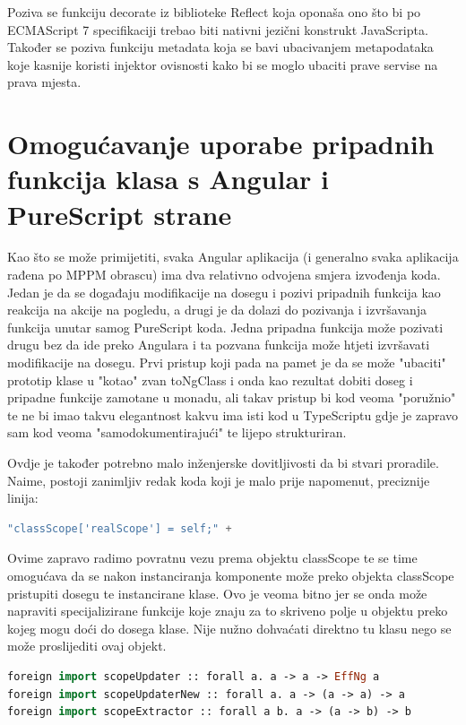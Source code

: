 \documentclass[times, utf8, zavrsni]{fer}
\begin{document}
Poziva se funkciju decorate iz biblioteke Reflect koja oponaša ono što bi po ECMAScript 7 specifikaciji trebao biti nativni jezični konstrukt JavaScripta. Također se poziva funkciju metadata koja se bavi ubacivanjem metapodataka koje kasnije koristi injektor ovisnosti kako bi se moglo ubaciti prave servise na prava mjesta.

\section{Omogućavanje uporabe pripadnih funkcija klasa s Angular i PureScript strane}
Kao što se može primijetiti, svaka Angular aplikacija (i generalno svaka aplikacija rađena po MPPM obrascu) ima dva relativno odvojena smjera izvođenja koda. Jedan je da se događaju modifikacije na dosegu i pozivi pripadnih funkcija kao reakcija na akcije na pogledu, a drugi je da dolazi do pozivanja i izvršavanja funkcija unutar samog PureScript koda. Jedna pripadna funkcija može pozivati drugu bez da ide preko Angulara i ta pozvana funkcija može htjeti izvršavati modifikacije na dosegu. Prvi pristup koji pada na pamet je da se može "ubaciti" prototip klase u "kotao" zvan toNgClass i onda kao rezultat dobiti doseg i pripadne funkcije zamotane u monadu, ali takav pristup bi kod veoma "poružnio" te ne bi imao takvu elegantnost kakvu ima isti kod u TypeScriptu gdje je zapravo sam kod veoma "samodokumentirajući" te lijepo strukturiran.

Ovdje je također potrebno malo inženjerske dovitljivosti da bi stvari proradile. Naime, postoji zanimljiv redak koda koji je malo prije napomenut, preciznije linija:

\begin{lstlisting}[language=JavaScript, basicstyle=\small\linespread{0.8}]
      "classScope['realScope'] = self;" +
\end{lstlisting}

Ovime zapravo radimo povratnu vezu prema objektu classScope te se time omogućava da se nakon instanciranja komponente može preko objekta classScope pristupiti dosegu te instancirane klase. Ovo je veoma bitno jer se onda može napraviti specijalizirane funkcije koje znaju za to skriveno polje u objektu preko kojeg mogu doći do dosega klase. Nije nužno dohvaćati direktno tu klasu nego se može proslijediti ovaj objekt.

\begin{lstlisting}[language=PureScript, basicstyle=\small\linespread{0.8}]
foreign import scopeUpdater :: forall a. a -> a -> EffNg a
foreign import scopeUpdaterNew :: forall a. a -> (a -> a) -> a
foreign import scopeExtractor :: forall a b. a -> (a -> b) -> b
\end{lstlisting}
\end{document}
